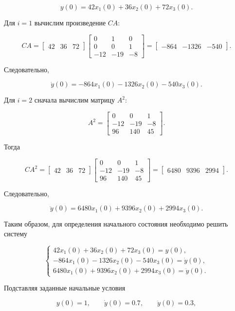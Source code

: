 \documentclass[a4paper, 12pt]{article}
\begin{document}
\[
y(0) =
42x_1(0) + 36x_2(0) + 72x_3(0).
\]

Для $i=1$ вычислим произведение $CA$:

\[
CA =
\begin{bmatrix}
42 & 36 & 72
\end{bmatrix}
\begin{bmatrix}
0 & 1 & 0\\
0 & 0 & 1\\
-12 & -19 & -8
\end{bmatrix}
=
\begin{bmatrix}
-864 & -1326 & -540
\end{bmatrix}.
\]

Следовательно,

\[
\dot{y}(0) =
-864x_1(0) - 1326x_2(0) - 540x_3(0).
\]

Для $i=2$ сначала вычислим матрицу $A^2$:

\[
A^2 =
\begin{bmatrix}
0 & 0 & 1\\
-12 & -19 & -8\\
96 & 140 & 45
\end{bmatrix}.
\]

Тогда

\[
CA^2 =
\begin{bmatrix}
42 & 36 & 72
\end{bmatrix}
\begin{bmatrix}
0 & 0 & 1\\
-12 & -19 & -8\\
96 & 140 & 45
\end{bmatrix}
=
\begin{bmatrix}
6480 & 9396 & 2994
\end{bmatrix}.
\]

Следовательно,

\[
\ddot{y}(0) =
6480x_1(0) + 9396x_2(0) + 2994x_3(0).
\]

Таким образом, для определения начального состояния необходимо решить
систему

\[
\begin{cases}
42x_1(0) + 36x_2(0) + 72x_3(0) = y(0),\\
-864x_1(0) - 1326x_2(0) - 540x_3(0) = \dot{y}(0),\\
6480x_1(0) + 9396x_2(0) + 2994x_3(0) = \ddot{y}(0).
\end{cases}
\]

Подставляя заданные начальные условия

\[
y(0)=1,\qquad
\dot{y}(0)=0.7,\qquad
\ddot{y}(0)=0.3,
\]
\end{document}
